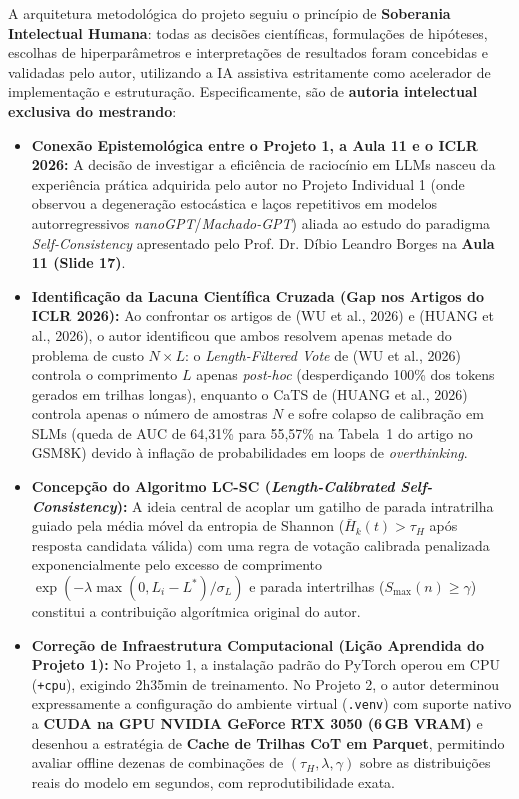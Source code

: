 \documentclass[9pt,a4paper]{extarticle}
\begin{document}
A arquitetura metodol\'{o}gica do projeto seguiu o princ\'{i}pio de \textbf{Soberania Intelectual Humana}: todas as decis\~{o}es cient\'{i}ficas, formula\c{c}\~{o}es de hip\'{o}teses, escolhas de hiperpar\^{a}metros e interpreta\c{c}\~{o}es de resultados foram concebidas e validadas pelo autor, utilizando a IA assistiva estritamente como acelerador de implementa\c{c}\~{a}o e estrutura\c{c}\~{a}o. Especificamente, s\~{a}o de \textbf{autoria intelectual exclusiva do mestrando}:

\begin{itemize}[leftmargin=1.3em, itemsep=1.5pt, topsep=1pt]
    \item \textbf{Conex\~{a}o Epistemol\'{o}gica entre o Projeto 1, a Aula 11 e o ICLR 2026:} A decis\~{a}o de investigar a efici\^{e}ncia de racioc\'{i}nio em LLMs nasceu da experi\^{e}ncia pr\'{a}tica adquirida pelo autor no Projeto Individual 1 (onde observou a degenera\c{c}\~{a}o estoc\'{a}stica e la\c{c}os repetitivos em modelos autorregressivos \textit{nanoGPT}/\textit{Machado-GPT}) aliada ao estudo do paradigma \textit{Self-Consistency} apresentado pelo Prof. Dr. D\'{i}bio Leandro Borges na \textbf{Aula 11 (Slide 17)}.
    \item \textbf{Identifica\c{c}\~{a}o da Lacuna Cient\'{i}fica Cruzada (Gap nos Artigos do ICLR 2026):} Ao confrontar os artigos de (WU et al., 2026) e (HUANG et al., 2026), o autor identificou que ambos resolvem apenas metade do problema de custo $N \times L$: o \textit{Length-Filtered Vote} de (WU et al., 2026) controla o comprimento $L$ apenas \textit{post-hoc} (desperdi\c{c}ando 100\% dos tokens gerados em trilhas longas), enquanto o CaTS de (HUANG et al., 2026) controla apenas o n\'{u}mero de amostras $N$ e sofre colapso de calibra\c{c}\~{a}o em SLMs (queda de AUC de 64,31\% para 55,57\% na Tabela~1 do artigo no GSM8K) devido \`{a} infla\c{c}\~{a}o de probabilidades em loops de \textit{overthinking}.
    \item \textbf{Concep\c{c}\~{a}o do Algoritmo LC-SC (\textit{Length-Calibrated Self-Consistency}):} A ideia central de acoplar um gatilho de parada intratrilha guiado pela m\'{e}dia m\'{o}vel da entropia de Shannon ($\bar{H}_k(t) > \tau_H$ ap\'{o}s resposta candidata v\'{a}lida) com uma regra de vota\c{c}\~{a}o calibrada penalizada exponencialmente pelo excesso de comprimento $\exp(-\lambda \max(0, L_i - L^*)/\sigma_L)$ e parada intertrilhas ($S_{\max}(n) \ge \gamma$) constitui a contribui\c{c}\~{a}o algor\'{i}tmica original do autor.
    \item \textbf{Corre\c{c}\~{a}o de Infraestrutura Computacional (Li\c{c}\~{a}o Aprendida do Projeto 1):} No Projeto 1, a instala\c{c}\~{a}o padr\~{a}o do PyTorch operou em CPU (\texttt{+cpu}), exigindo 2h35min de treinamento. No Projeto 2, o autor determinou expressamente a configura\c{c}\~{a}o do ambiente virtual (\texttt{.venv}) com suporte nativo a \textbf{CUDA na GPU NVIDIA GeForce RTX 3050 (6\,GB VRAM)} e desenhou a estrat\'{e}gia de \textbf{Cache de Trilhas CoT em Parquet}, permitindo avaliar offline dezenas de combina\c{c}\~{o}es de $(\tau_H, \lambda, \gamma)$ sobre as distribui\c{c}\~{o}es reais do modelo em segundos, com reprodutibilidade exata.
\end{itemize}
\end{document}
